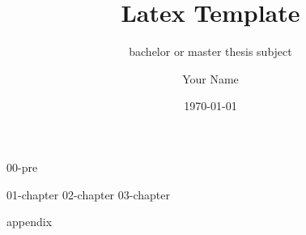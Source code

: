 \documentclass[
	final %
	,12pt %
	,a4paper %
	,BCOR=12mm %
	,headings=normal %
	,toc=graduated %
	,bibliography=totoc %
]{scrreprt} %
\author{Your Name}
\title{Latex Template}
\subtitle{bachelor or master thesis subject}
\date{\today}
\begin{document}
{00-pre} %

{01-chapter}
{02-chapter}
{03-chapter}

\newpage


{appendix}
\end{document}

